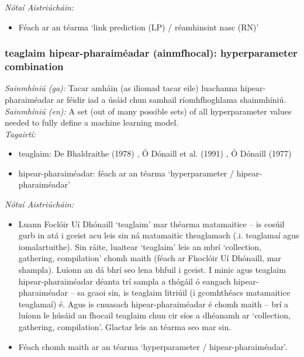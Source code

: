  \noindent \textit{Nótaí Aistriúcháin:}
\begin{itemize}
	\item Féach ar an téarma `link prediction (LP) / réamhinsint nasc (RN)'
\end{itemize}


\subsubsection*{teaglaim hipear-pharaiméadar (ainmfhocal): hyperparameter combination}
 \noindent \textit{Sainmhíniú (ga):} Tacar amháin (as iliomad tacar eile) luachanna hipear-pharaiméadar ar féidir iad a úsáid chun samhail ríomhfhoghlama shainmhíniú.
\\
 \noindent \textit{Sainmhíniú (en):} A set (out of many possible sets) of all hyperparameter values needed to fully define a machine learning model.
\\
 \noindent \textit{Tagairtí:}
\begin{itemize}
	\item teaglaim: De Bhaldraithe (1978) \cite{de-bhaldraithe}, Ó Dónaill et al. (1991) \cite{focloir-beag}, Ó Dónaill (1977) \cite{odonaill}
	\item hipear-pharaiméadar: féach ar an téarma `hyperparameter / hipear-pharaiméadar'
\end{itemize}

 \noindent \textit{Nótaí Aistriúcháin:}
\begin{itemize}
	\item Luann Foclóir Uí Dhónaill `teaglaim' mar théarma matamaitice -- is cosúil gurb in atá i gceist acu leis sin ná matamaitic theaglamach (.i. teaglamaí agus iomalartuithe). Sin ráite, luaitear `teaglaim' leis an mbrí `collection, gathering, compilation' chomh maith (féach ar Fhoclóir Uí Dhónaill, mar shampla). Luíonn an dá bhrí seo lena bhfuil i gceist. I minic agus teaglaim hipear-pharaiméadar déanta trí sampla a thógáil ó eangach hipear-pharaiméadar -- sa gcaoi sin, is teaglaim litriúil (i gcomhthéacs matamaitice teaglamaí) é. Agus is cnuasach hipear-pharaiméadar é chomh maith -- brí a luíonn le húsáid an fhocail teaglaim chun cir síos a dhéanamh ar `collection, gathering, compilation'. Glactar leis an téarma seo mar sin.
	\item Féach chomh maith ar an téarma `hyperparameter / hipear-pharaiméadar'.
\end{itemize}


